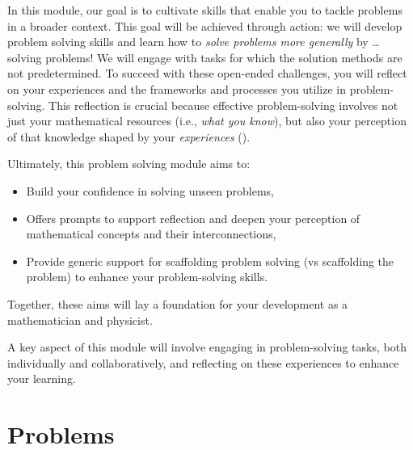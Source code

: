 \documentclass[
  a4paper,
  DIV=11,
  numbers=noendperiod,
  oneside]{scrreprt}
\providecommand{\tightlist}{%
  \setlength{\itemsep}{0pt}\setlength{\parskip}{0pt}}
\begin{document}
In this module, our goal is to cultivate skills that enable you to
tackle problems in a broader context. This goal will be achieved through
action: we will develop problem solving skills and learn how to
\emph{solve problems more generally} by \ldots{} solving problems! We
will engage with tasks for which the solution methods are not
predetermined. To succeed with these open-ended challenges, you will
reflect on your experiences and the frameworks and processes you utilize
in problem-solving. This reflection is crucial because effective
problem-solving involves not just your mathematical resources (i.e.,
\emph{what you know}), but also your perception of that knowledge shaped
by your \emph{experiences} ().

Ultimately, this problem solving module aims to:

\begin{itemize}
\tightlist
\item
  Build your confidence in solving unseen problems,
\item
  Offers prompts to support reflection and deepen your perception of
  mathematical concepts and their interconnections,
\item
  Provide generic support for scaffolding problem solving (vs
  scaffolding the problem) to enhance your problem-solving skills.
\end{itemize}

Together, these aims will lay a foundation for your development as a
mathematician and physicist.

\begin{tcolorbox}[enhanced jigsaw, colframe=quarto-callout-note-color-frame, title=\textcolor{quarto-callout-note-color}{\faInfo}\hspace{0.5em}{TL;DR}, breakable, opacityback=0, titlerule=0mm, colbacktitle=quarto-callout-note-color!10!white, toptitle=1mm, colback=white, coltitle=black, toprule=.15mm, bottomtitle=1mm, left=2mm, arc=.35mm, rightrule=.15mm, bottomrule=.15mm, opacitybacktitle=0.6, leftrule=.75mm]

A key aspect of this module will involve engaging in problem-solving
tasks, both individually and collaboratively, and reflecting on these
experiences to enhance your learning.

\end{tcolorbox}

\chapter{Problems}\label{sec-problems}
\end{document}

